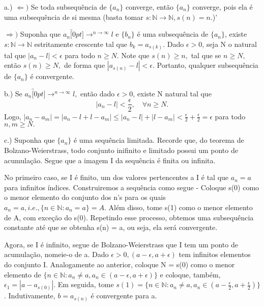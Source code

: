 \documentclass[Analysis/analysis_notes.tex]{subfiles}
\begin{document}
\begin{proof*}
	a.) $\Leftarrow)$ Se toda subsequ\^encia de $\{a_{n}\}$ converge, ent\~ao $\{a_{n}\}$ converge, pois ela \'e uma subsequ\^encia de si mesma (basta tomar $s:\mathbb{N}\rightarrow \mathbb{N}, s(n) = n.$)'

	$\Rightarrow)$ Suponha que $a_{n}\overbracket[0pt]{\longrightarrow}^{n\to \infty}l$ e $\{b_{n}\}$ \'e uma subsequ\^encia de $\{a_{n}\}$, existe
	$s:\mathbb{N}\rightarrow \mathbb{N}$ estritamente crescente tal que $b_{k} = a_{s(k)}.$ Dado $\epsilon > 0$, seja N o natural tal que
	$|a_{n} - l| < \epsilon$ para todo $n\geq{N}.$ Note que $s(n)\geq{n},$ tal que se $n\geq{N},$ ent\~ao $s(n)\geq{N},$ de forma que
	$|a_{s(n)} - l| < \epsilon$. Portanto, qualquer subsequ\^encia de $\{a_{n}\}$ \'e convergente.

	b.) Se $a_{n}\overbracket[0pt]{\longrightarrow}^{n\to \infty}l,$ ent\~ao dado $\epsilon > 0$, existe N natural tal que
	$$
		|a_{n}-l|<\frac{\epsilon}{2},\quad\forall n\geq{N}.
	$$
	Logo, $|a_{n}-a_{m}| = |a_{n}-l + l-a_{m}| \leq{|a_{n}-l| + |l-a_{m}|} < \frac{\epsilon}{2} + \frac{\epsilon}{2} = \epsilon$ para todo $n, m \geq{N}.$

	c.) Suponha que $\{a_{n}\}$ \'e uma sequ\^encia limitada. Recorde que, do teorema de Bolzano-Weierstrass, todo conjunto inifinito e limitado
	possui um ponto de acumula\c c\~ao. Segue que a imagem I da sequ\^encia \'e finita ou infinita.

	No primeiro caso, se I \'e finito, um dos valores pertencentes a I \'e tal que $a_{n} = a$ para infinitos \'indices.
	Construiremos a sequ\^encia como segue - Coloque s(0) como o menor elemento do conjunto dos n's para os quais
	$a_{n} = a, i.e.,\{n\in \mathbb{N}: a_{n} = a\} = A. $ Al\'em disso, tome s(1) como  o menor elemento de A, com  exce\c c\~ao do
	s(0). Repetindo esse processo, obtemos uma subsequ\^encia constante at\'e que se obtenha s(n) = a, ou seja, ela ser\'a convergente.

	Agora, se I \'e infinito, segue de Bolzano-Weierstrass que I tem um ponto de acumula\c c\~ao, nomeie-o de a. Dado $\epsilon > 0, (a-\epsilon, a+\epsilon)$
	tem infinitos elementos do conjunto I. Analogamente ao anterior, coloque N = s(0) como o menor elemento de $\{n\in \mathbb{N}: a_{n}\neq a, a_{n}\in(a-\epsilon, a+\epsilon)\}$ e coloque, tamb\'em,
	$\epsilon_{1} = |a-a_{s(0)}|$. Em seguida, tome $s(1) = \{n\in \mathbb{N}: a_{n}\neq a, a_{n}\in(a-\frac{\epsilon}{2}, a+\frac{\epsilon}{2})\}$. Indutivamente,
	$b = a_{s(n)}$ \'e convergente para a.


\end{proof*}
\end{document}

